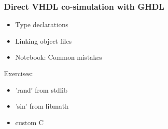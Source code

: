 \documentclass[xcolor={usenames,dvipsnames}]{beamer}
\begin{document}
\begin{frame}
\frametitle{Direct VHDL co-simulation with GHDL}

\begin{itemize}
\item Type declarations \href{https://ghdl.github.io/ghdl-cosim/vhpidirect/declarations.html}{\faBook}
\item Linking object files \href{https://ghdl.github.io/ghdl-cosim/vhpidirect/linking.html}{\faBook}
\item Notebook: Common mistakes \href{https://ghdl.github.io/ghdl-cosim/vhpidirect/notebook/mistakes.html}{\faBook}
\end{itemize}

\vfill

Exercises:
\begin{itemize}
\item 'rand' from stdlib
\href{https://ghdl.github.io/ghdl-cosim/vhpidirect/examples/quickstart.html\#rand-from-stdlib}{\faBook}
\href{https://github.com/ghdl/ghdl-cosim/blob/master/vhpidirect/quickstart/random}{\faCode}

\item 'sin' from libmath
\href{https://ghdl.github.io/ghdl-cosim/vhpidirect/examples/quickstart.html\#sin-from-libmath}{\faBook}
\href{https://github.com/ghdl/ghdl-cosim/blob/master/vhpidirect/quickstart/math}{\faCode}

\item custom C
\href{https://ghdl.github.io/ghdl-cosim/vhpidirect/examples/quickstart.html\#custom-c}{\faBook}
\href{https://github.com/ghdl/ghdl-cosim/blob/master/vhpidirect/quickstart/customc}{\faCode}
\end{itemize}

\end{frame}
\end{document}
